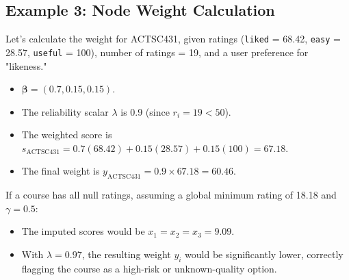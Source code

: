 \documentclass[11pt]{article}
\begin{document}
\subsection{Example 3: Node Weight Calculation}

Let's calculate the weight for ACTSC431, given ratings (\texttt{liked} = 68.42, \texttt{easy} = 28.57, \texttt{useful} = 100), number of ratings = 19, and a user preference for "likeness."
\begin{itemize}
    \item $\boldsymbol{\beta} = (0.7, 0.15, 0.15)$.
    \item The reliability scalar $\lambda$ is 0.9 (since $r_i=19 < 50$).
    \item The weighted score is $s_{\mathrm{ACTSC431}} = 0.7(68.42) + 0.15(28.57) + 0.15(100) = 67.18$.
    \item The final weight is $y_{\mathrm{ACTSC431}} = 0.9 \times 67.18 = 60.46$.
\end{itemize}
If a course has all null ratings, assuming a global minimum rating of 18.18 and $\gamma=0.5$:
\begin{itemize}
    \item The imputed scores would be $x_1=x_2=x_3=9.09$.
    \item With $\lambda = 0.97$, the resulting weight $y_i$ would be significantly lower, correctly flagging the course as a high-risk or unknown-quality option.
\end{itemize}
\end{document}
